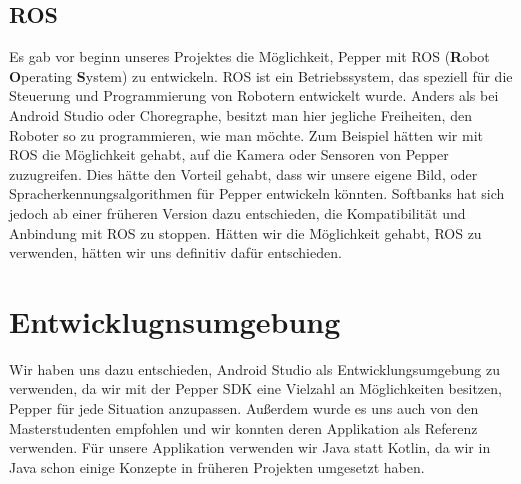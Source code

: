 \subsection{ROS}

Es gab vor beginn unseres Projektes die Möglichkeit, Pepper mit ROS (\textbf{R}obot \textbf{O}perating \textbf{S}ystem) zu entwickeln. ROS ist ein Betriebssystem, das speziell für die Steuerung und Programmierung von Robotern entwickelt wurde. Anders als bei Android Studio oder Choregraphe, besitzt man hier jegliche Freiheiten, den Roboter so zu programmieren, wie man möchte. Zum Beispiel hätten wir mit ROS die Möglichkeit gehabt, auf die Kamera oder Sensoren von Pepper zuzugreifen.
Dies hätte den Vorteil gehabt, dass wir unsere eigene Bild, oder Spracherkennungsalgorithmen für Pepper entwickeln könnten. Softbanks hat sich
jedoch ab einer früheren Version dazu entschieden, die Kompatibilität und Anbindung mit ROS zu stoppen. Hätten wir die Möglichkeit gehabt, ROS zu verwenden, hätten wir uns definitiv dafür entschieden. \\

\section{Entwicklugnsumgebung}

Wir haben uns dazu entschieden, Android Studio als Entwicklungsumgebung zu verwenden, da wir mit der Pepper SDK eine Vielzahl an Möglichkeiten besitzen, Pepper für jede Situation anzupassen. Außerdem wurde es uns auch von den Masterstudenten empfohlen und wir konnten deren Applikation als Referenz verwenden. Für unsere Applikation verwenden wir Java statt Kotlin, da wir in Java schon einige Konzepte in früheren Projekten umgesetzt haben.\\

